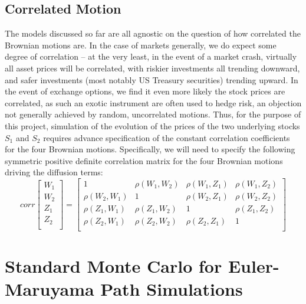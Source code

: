 \documentclass{article}
\begin{document}
\subsection{Correlated Motion}
	The models discussed so far are all agnostic on the question of how correlated the Brownian motions are. In the case of markets generally, we do expect some degree of correlation -- at the very least, in the event of a market crash, virtually all asset prices will be correlated, with riskier investments all trending downward, and safer investments (most notably US Treasury securities) trending upward. In the event of exchange options, we find it even more likely the stock prices are correlated, as such an exotic instrument are often used to hedge risk, an objection not generally achieved by random, uncorrelated motions. Thus, for the purpose of this project, simulation of the evolution of the prices of the two underlying stocks $S_1$ and $S_2$ requires advance specification of the constant correlation coefficients for the four Brownian motions. Specifically, we will need to specify the following symmetric positive definite correlation matrix for the four Brownian motions driving the diffusion terms:
	\begin{equation}
	corr
	\begin{bmatrix} 
	W_1  \\
	W_2  \\
	Z_1  \\
	Z_2  \\
	\end{bmatrix}
	=
	\begin{bmatrix} 
	1 & \rho(W_1,W_2) & \rho(W_1,Z_1) & \rho(W_1,Z_2) \\
	\rho(W_2,W_1) & 1 & \rho(W_2,Z_1) & \rho(W_2,Z_2) \\
	\rho(Z_1,W_1) & \rho(Z_1,W_2) & 1 & \rho(Z_1,Z_2) \\
	\rho(Z_2,W_1) & \rho(Z_2,W_2) & \rho(Z_2,Z_1) & 1 \\
	\end{bmatrix}
	\end{equation}
	
\section{Standard Monte Carlo for Euler-Maruyama Path Simulations}
\end{document}
